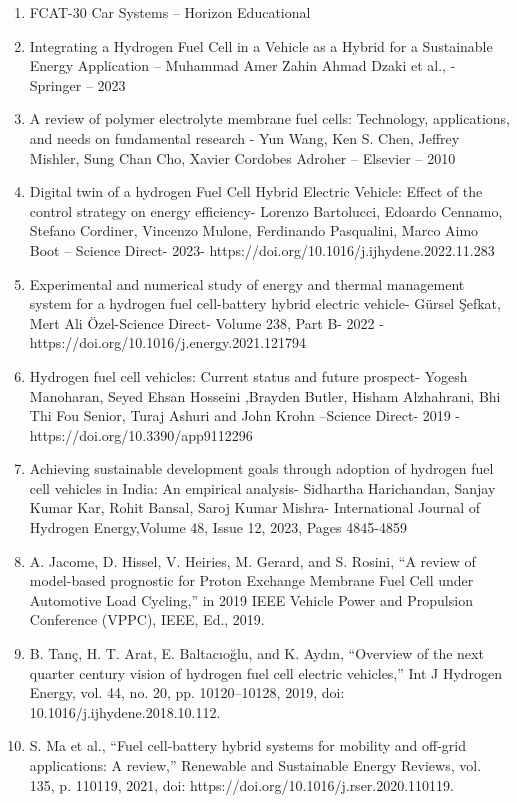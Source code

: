 \documentclass[
	a4paper, %
	10pt, %
]{LTJournalArticle}
\begin{document}
\begin{enumerate}
    \item FCAT-30 Car Systems – Horizon Educational
    \item Integrating a Hydrogen Fuel Cell in a Vehicle as a Hybrid for a Sustainable Energy Application – Muhammad Amer Zahin Ahmad Dzaki et al., - Springer – 2023
    \item A review of polymer electrolyte membrane fuel cells: Technology, applications, and needs on fundamental research - Yun Wang, Ken S. Chen, Jeffrey Mishler, Sung Chan Cho, Xavier Cordobes Adroher – Elsevier – 2010
    \item Digital twin of a hydrogen Fuel Cell Hybrid Electric Vehicle: Effect of the control strategy on energy efficiency- Lorenzo Bartolucci, Edoardo Cennamo, Stefano Cordiner, Vincenzo Mulone, Ferdinando Pasqualini, Marco Aimo Boot – Science Direct- 2023- https://doi.org/10.1016/j.ijhydene.2022.11.283
    \item Experimental and numerical study of energy and thermal management system for a hydrogen fuel cell-battery hybrid electric vehicle- Gürsel Şefkat, Mert Ali Özel-Science Direct-  Volume 238, Part B- 2022 - https://doi.org/10.1016/j.energy.2021.121794
    \item Hydrogen fuel cell vehicles: Current status and future prospect- Yogesh Manoharan, Seyed Ehsan Hosseini ,Brayden Butler, Hisham Alzhahrani, Bhi Thi Fou Senior, Turaj Ashuri and John Krohn –Science Direct- 2019 - https://doi.org/10.3390/app9112296
    \item Achieving sustainable development goals through adoption of hydrogen fuel cell vehicles in India: An empirical analysis- Sidhartha Harichandan, Sanjay Kumar Kar, Rohit Bansal, Saroj Kumar Mishra- International Journal of Hydrogen Energy,Volume 48, Issue 12, 2023, Pages 4845-4859
    \item A. Jacome, D. Hissel, V. Heiries, M. Gerard, and S. Rosini, “A review of model-based prognostic for Proton Exchange Membrane Fuel Cell under Automotive Load Cycling,” in 2019 IEEE Vehicle Power and Propulsion Conference (VPPC), IEEE, Ed., 2019.
    \item B. Tanç, H. T. Arat, E. Baltacıoğlu, and K. Aydın, “Overview of the next quarter century vision of hydrogen fuel cell electric vehicles,” Int J Hydrogen Energy, vol. 44, no. 20, pp. 10120–10128, 2019, doi: 10.1016/j.ijhydene.2018.10.112.
    \item S. Ma et al., “Fuel cell-battery hybrid systems for mobility and off-grid applications: A review,” Renewable and Sustainable Energy Reviews, vol. 135, p. 110119, 2021, doi: https://doi.org/10.1016/j.rser.2020.110119.


 



 
\end{enumerate}




\end{document}
